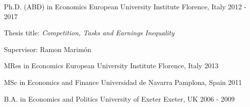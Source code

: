 

\begin{cventries}

  \cventry
    {Ph.D. (ABD) in Economics} %
    {European University Institute} %
    {Florence, Italy} %
    {2012 - 2017} %
    {
        \begin{cvitems} %
            \item {Thesis title: \textit{Competition, Tasks and Earnings Inequality}}
            \item {Supervisor: Ramon Marimón}
        \end{cvitems}
    }

\cventry
    {MRes in Economics} %
    {European University Institute} %
    {Florence, Italy} %
    {2013} %
    {}

\cventry
    {MSc in Economics and Finance} %
    {Universidad de Navarra} %
    {Pamplona, Spain} %
    {2011} %
    {}

\cventry
    {B.A. in Economics and Politics} %
    {University of Exeter} %
    {Exeter, UK} %
    {2006 - 2009} %
    {}

\end{cventries}
